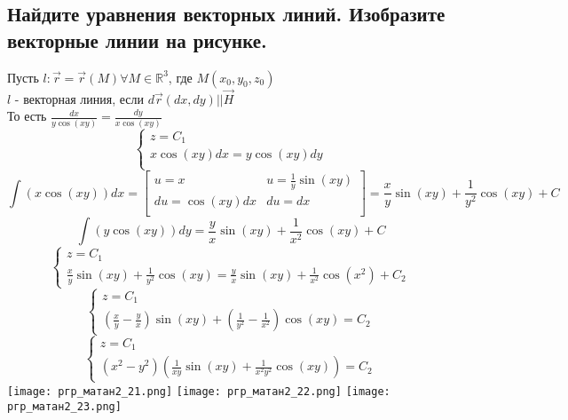 \documentclass{article}
\begin{document}
    \subsection{Найдите уравнения векторных линий. Изобразите векторные линии на рисунке.}
    Пусть $l: \overrightarrow{r} = \overrightarrow{r} (M) \forall M \in \mathbb{R}^3$, где $M(x_0, y_0, z_0)$ \\
    $l$ - векторная линия, если $d\overrightarrow{r}(dx, dy) \text{||} \overrightarrow{H}$\\
    То есть $\frac{dx}{y\cos(xy)} = \frac{dy}{x\cos(xy)}$\\
    \begin{equation*}
        \begin{cases}
            z = C_1\\
            x \cos(xy) dx = y \cos(xy) dy\\            
        \end{cases}
    \end{equation*}
    \begin{equation*}
        \int (x \cos (xy))dx = 
        \left[
        \begin{array}{cc}
            u = x & u = \frac{1}{y}\sin(xy) \\
            du = \cos(xy) dx & du = dx \\ 
        \end{array}
        \right] = 
        \frac{x}{y} \sin (xy) + \frac{1}{y^2} \cos (xy) + C
    \end{equation*}
    \begin{equation*}
        \int (y \cos (xy)) dy = \frac{y}{x} \sin (xy) + \frac{1}{x^2} \cos(xy) + C
    \end{equation*}
    \begin{equation*}
        \begin{cases}
            z = C_1\\
            \frac{x}{y} \sin(xy) + \frac{1}{y^2} \cos(xy) = \frac{y}{x} \sin (xy) + \frac{1}{x^2} \cos (x^2) + C_2
        \end{cases}
    \end{equation*}
    \begin{equation*}
        \begin{cases}
            z = C_1\\
            (\frac{x}{y} - \frac{y}{x}) \sin (xy) + (\frac{1}{y^2} - \frac{1}{x^2}) \cos (xy) = C_2
        \end{cases}
    \end{equation*}
    \begin{equation*}
        \begin{cases}
            z = C_1\\
            (x^2 - y^2)(\frac{1}{xy}\sin (xy) + \frac{1}{x^2y^2}\cos(xy)) = C_2
        \end{cases}
    \end{equation*}
    \texttt{[image: ргр\_матан2\_21.png]}
    \texttt{[image: ргр\_матан2\_22.png]}
    \texttt{[image: ргр\_матан2\_23.png]}
    
\end{document}
